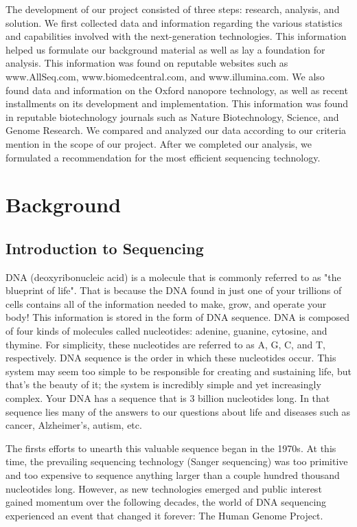 \documentclass[12pt,letterpaper]{report}
\begin{document}
The development of our project consisted of three steps: research, analysis, and solution. We first collected data and information regarding the various statistics and capabilities involved with the next-generation technologies. This information helped us formulate our background material as well as lay a foundation for analysis. This information was found on reputable websites such as www.AllSeq.com, www.biomedcentral.com, and www.illumina.com. We  also found data and information on the Oxford nanopore technology, as well as recent installments on its development and implementation. This information was found in reputable biotechnology journals such as Nature Biotechnology, Science, and Genome Research. We compared and analyzed our data according to our criteria mention in the scope of our project. After we completed our analysis, we formulated a recommendation for the most efficient sequencing technology.

\section{Background}

\subsection{Introduction to Sequencing}

DNA (deoxyribonucleic acid) is a molecule that is commonly referred to as "the blueprint of life". That is because the DNA found in just one of your trillions of cells contains all of the information needed to make, grow, and operate your body! This information is stored in the form of DNA sequence. DNA is composed of four kinds of molecules called nucleotides: adenine, guanine, cytosine, and thymine. For simplicity, these nucleotides are referred to as A, G, C, and T, respectively. DNA sequence is the order in which these nucleotides occur. This system may seem too simple to be responsible for creating and sustaining life, but that's the beauty of it; the system is incredibly simple and yet increasingly complex. Your DNA has a sequence that is 3 billion nucleotides long. In that sequence lies many of the answers to our questions about life and diseases such as cancer, Alzheimer's, autism, etc.

The firsts efforts to unearth this valuable sequence began in the 1970s. At this time, the prevailing sequencing technology (Sanger sequencing) was too primitive and too expensive to sequence anything larger than a couple hundred thousand nucleotides long. However, as new technologies emerged and public interest gained momentum over the following decades, the world of DNA sequencing experienced an event that changed it forever: The Human Genome Project. 
\end{document}
